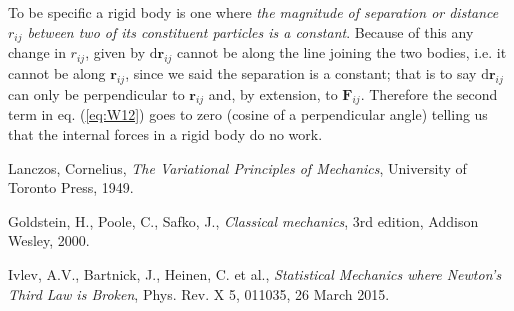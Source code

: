 \documentclass[english,seminar,headertitle]{lecture}
\begin{document}
To be specific a rigid body is one where \textit{the magnitude of separation or distance $r_{ij}$ between two of its constituent particles is a constant}. Because of this any change in $r_{ij}$, given by $\textrm{d}\mathbf{r}_{ij}$ cannot be along the line joining the two bodies, i.e. it cannot be along $\mathbf{r}_{ij}$, since we said the separation is a constant; that is to say $\textrm{d}\mathbf{r}_{ij}$ can only be perpendicular to $\mathbf{r}_{ij}$ and, by extension, to $\mathbf{F}_{ij}$. Therefore the second term in eq. (\ref{eq:W12}) goes to zero (cosine of a perpendicular angle) telling us that the internal forces in a rigid body do no work.
%
\begin{thebibliography}{1}
	Lanczos, Cornelius, \textit{The Variational Principles of Mechanics}, University of Toronto Press, 1949.
	
	Goldstein, H., Poole, C., Safko, J., \textit{Classical mechanics}, 3rd edition, Addison Wesley, 2000.
	
	Ivlev, A.V., Bartnick, J., Heinen, C. et al., \textit{Statistical Mechanics where Newton's Third Law is Broken}, Phys. Rev. X 5, 011035, 26 March 2015.
\end{thebibliography}
\end{document}
